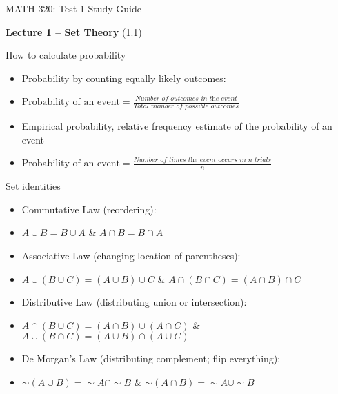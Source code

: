 \documentclass{article}
\newcommand{\bu}[1]{\textbf{\ul{#1}}}				%
\newcommand{\comp}{{\sim}}			%
\begin{document}
\begin{center}
{\Huge MATH 320: Test 1 Study Guide}

\end{center}

\bigskip\bigskip

{\large \bu{Lecture 1 -- Set Theory}} (1.1)\bigskip

How to calculate probability
\begin{itemize}
    \item Probability by counting equally likely outcomes:
    \item[] $\displaystyle \text{Probability of an event} = \frac{\textit{Number of outcomes in the event}}{\textit{Total number of possible outcomes}}$
    \item Empirical probability, relative frequency estimate of the probability of an event
    \item[] $\displaystyle \text{Probability of an event} = \frac{\textit{Number of times the event occurs in n trials}}{\textit{n}}$
\end{itemize}\bigskip
    
Set identities
\begin{itemize}
    \item Commutative Law (reordering): 
    \item[] $A \cup B = B \cup A$ \hspace{10pt} \& \hspace{10pt} $A \cap B = B \cap A$ 
    \item Associative Law (changing location of parentheses):
    \item[] $A \cup (B \cup C) = (A \cup B) \cup C$ \hspace{10pt} \& \hspace{10pt} $A \cap (B \cap C) = (A \cap B) \cap C$
    \item Distributive Law (distributing union or intersection):
    \item[] $A \cap (B \cup C) = (A \cap B) \cup (A \cap C)$ \hspace{10pt} \& \hspace{10pt} $A \cup (B \cap C) = (A \cup B) \cap (A \cup C)$
    \item De Morgan's Law (distributing complement; flip everything):
    \item[] $\comp (A \cup B) = \comp A \cap \comp B$ \hspace{10pt} \& \hspace{10pt} $\comp (A \cap B) = \comp A \cup \comp B$
\end{itemize}\bigskip
\end{document}
